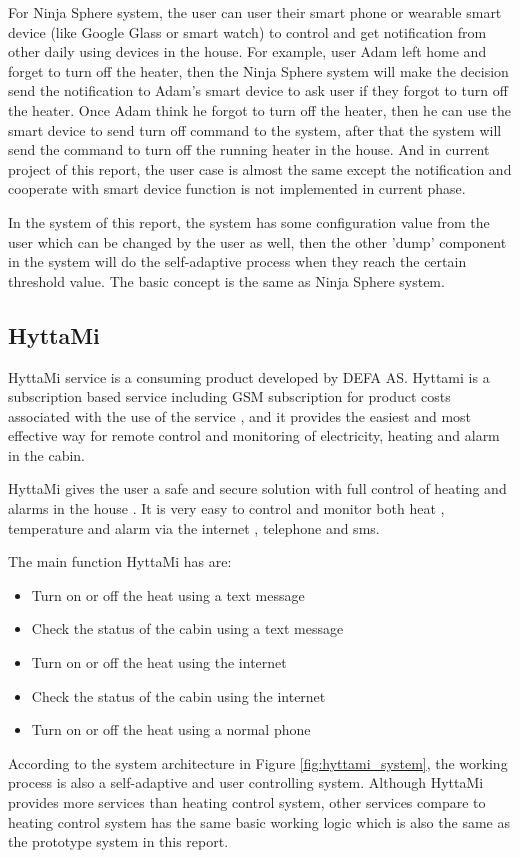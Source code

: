\par For Ninja Sphere system, the user can user their smart phone or wearable smart device (like Google Glass or smart watch) to control and get notification from other daily using devices in the house. For example, user Adam left home and forget to turn off the heater, then the Ninja Sphere system will make the decision send the notification to Adam's smart device to ask user if they forgot to turn off the heater. Once Adam think he forgot to turn off the heater, then he can use the smart device to send turn off command to the system, after that the system will send the command to turn off the running heater in the house. And in current project of this report, the user case is almost the same except the notification and cooperate with smart device function is not implemented in current phase.
\par In the system of this report, the system has some configuration value from the user which can be changed by the user as well, then the other 'dump' component in the system will do the self-adaptive process when they reach the certain threshold value. The basic concept is the same as Ninja Sphere system.

\subsection{HyttaMi}

\par HyttaMi\cite{hyttami} service is a consuming product developed by DEFA AS\cite{defa}. Hyttami is a subscription based service including GSM subscription for product costs associated with the use of the service , and it provides the easiest and most effective way for remote control and monitoring of electricity, heating and alarm in the cabin.
\par HyttaMi gives the user a safe and secure solution with full control of heating and alarms in the house . It is very easy to control and monitor both heat , temperature and alarm via the internet , telephone and sms.
\par The main function HyttaMi has are:
\begin{itemize}
	\item Turn on or off the heat using a text message
	\item Check the status of the cabin using a text message
	\item Turn on or off the heat using the internet
	\item Check the status of the cabin using the internet
	\item Turn on or off the heat using a normal phone
\end{itemize}
\par According to the system architecture in Figure \ref{fig:hyttami_system}, the working process is also a self-adaptive and user controlling system. Although HyttaMi provides more services than heating control system, other services compare to heating control system has the same basic working logic which is also the same as the prototype system in this report.

